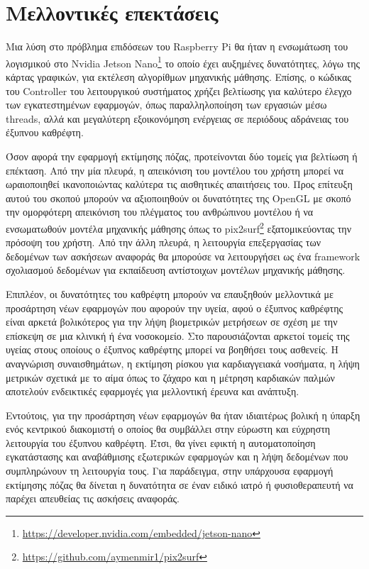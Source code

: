 \section{Μελλοντικές επεκτάσεις}
\label{sec:futures}

Μια λύση στο πρόβλημα επιδόσεων του Raspberry Pi θα ήταν η ενσωμάτωση του λογισμικού στο Nvidia Jetson Nano\footnote{\href{https://developer.nvidia.com/embedded/jetson-nano}{https://developer.nvidia.com/embedded/jetson-nano}} το οποίο έχει αυξημένες δυνατότητες, λόγω της κάρτας γραφικών, για εκτέλεση αλγορίθμων μηχανικής μάθησης. Επίσης, ο κώδικας του Controller του λειτουργικού συστήματος χρήζει βελτίωσης για καλύτερο έλεγχο των εγκατεστημένων εφαρμογών, όπως παραλληλοποίηση των εργασιών μέσω threads, αλλά και μεγαλύτερη εξοικονόμηση ενέργειας σε περιόδους αδράνειας του έξυπνου καθρέφτη.

Όσον αφορά την εφαρμογή εκτίμησης πόζας, προτείνονται δύο τομείς για βελτίωση ή επέκταση. Από την μία πλευρά, η απεικόνιση του μοντέλου του χρήστη μπορεί να ωραιοποιηθεί ικανοποιώντας καλύτερα τις αισθητικές απαιτήσεις του. Προς επίτευξη αυτού του σκοπού μπορούν να αξιοποιηθούν οι δυνατότητες της OpenGL με σκοπό την ομορφότερη απεικόνιση του πλέγματος του ανθρώπινου μοντέλου ή να ενσωματωθούν μοντέλα μηχανικής μάθησης όπως το pix2surf\footnote{\href{https://github.com/aymenmir1/pix2surf}{https://github.com/aymenmir1/pix2surf}} εξατομικεύοντας την πρόσοψη του χρήστη. Από την άλλη πλευρά, η λειτουργία επεξεργασίας των δεδομένων των ασκήσεων αναφοράς θα μπορούσε να λειτουργήσει ως ένα framework σχολιασμού δεδομένων για εκπαίδευση αντίστοιχων μοντέλων μηχανικής μάθησης.

Επιπλέον, οι δυνατότητες του καθρέφτη μπορούν να επαυξηθούν μελλοντικά με προσάρτηση νέων εφαρμογών που αφορούν την υγεία, αφού ο έξυπνος καθρέφτης είναι αρκετά βολικότερος για την λήψη βιομετρικών μετρήσεων σε σχέση με την επίσκεψη σε μια κλινική ή ένα νοσοκομείο. Στο \cite{reflect_health_paper} παρουσιάζονται αρκετοί τομείς της υγείας στους οποίους ο έξυπνος καθρέφτης μπορεί να βοηθήσει τους ασθενείς. Η αναγνώριση συναισθημάτων, η εκτίμηση ρίσκου για καρδιαγγειακά νοσήματα, η λήψη μετρικών σχετικά με το αίμα όπως το ζάχαρο και η μέτρηση καρδιακών παλμών αποτελούν ενδεικτικές εφαρμογές για μελλοντική έρευνα και ανάπτυξη.

Εντούτοις, για την προσάρτηση νέων εφαρμογών θα ήταν ιδιαιτέρως βολική η ύπαρξη ενός κεντρικού διακομιστή ο οποίος θα συμβάλλει στην εύρωστη και εύχρηστη λειτουργία του έξυπνου καθρέφτη. Έτσι, θα γίνει εφικτή η αυτοματοποίηση εγκατάστασης και αναβάθμισης εξωτερικών εφαρμογών και η λήψη δεδομένων που συμπληρώνουν τη λειτουργία τους. Για παράδειγμα, στην υπάρχουσα εφαρμογή εκτίμησης πόζας θα δίνεται η δυνατότητα σε έναν ειδικό ιατρό ή φυσιοθεραπευτή να παρέχει απευθείας τις ασκήσεις αναφοράς.

